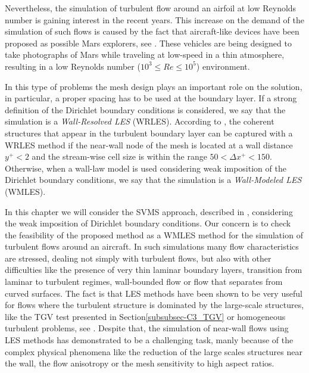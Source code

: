 Nevertheless, the simulation of turbulent flow around an airfoil at low Reynolds number is gaining interest in the recent years. This increase on the demand of the simulation of such flows is caused by the fact that aircraft-like devices have been proposed as possible Mars explorers, see \cite{kojima_large-eddy_2013,smith_mars_????,anyoji_low_????}. These vehicles are being designed to take photographs of Mars while traveling at low-speed in a thin atmosphere, resulting in a low Reynolds number ($ 10^3\le Re\le10^5 $) environment.

In this type of problems the mesh design plays an important role on the solution, in particular, a proper spacing has to be used at the boundary layer. If a strong definition of the Dirichlet boundary conditions is considered, we say that the simulation is a \textit{Wall-Resolved LES} (WRLES). According to \cite{piomelli_large-eddy_1996}, the coherent structures that appear in the turbulent boundary layer can be captured with a WRLES method if the near-wall node of the mesh is located at a wall distance $y^+<2$ and the stream-wise cell size is within the range $50<\Delta x^+<150$. Otherwise, when a wall-law model is used considering weak imposition of the Dirichlet boundary conditions, we say that the simulation is a \textit{Wall-Modeled LES} (WMLES).

In this chapter we will consider the SVMS approach, described in , considering the weak imposition of Dirichlet boundary conditions. Our concern is to check the feasibility of the proposed method as a WMLES method for the simulation of turbulent flows around an aircraft. In such simulations many flow characteristics are stressed, dealing not simply with turbulent flows, but also with other difficulties like the presence of very thin laminar boundary layers, transition from laminar to turbulent regimes, wall-bounded flow or flow that separates from curved surfaces. The fact is that LES methods have been shown to be very useful for flows where the turbulent structure is dominated by the large-scale structures, like the TGV test presented in Section\ref{subsubsec-C3_TGV} or homogeneous turbulent problems, see \cite{colomes_assessment_2015}. Despite that, the simulation of near-wall flows using LES methods has demonstrated to be a challenging task, manly because of the complex physical phenomena like the reduction of the large scales structures near the wall, the flow anisotropy or the mesh sensitivity to high aspect ratios. 

